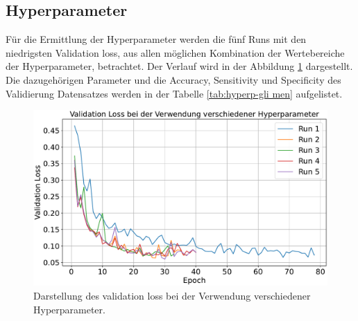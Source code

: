 \subsection{Hyperparameter}
Für die Ermittlung der Hyperparameter werden die fünf Runs mit den niedrigsten Validation loss, aus allen möglichen Kombination der Wertebereiche der Hyperparameter, betrachtet.
Der Verlauf wird in der Abbildung \ref{fig:val_loss gli-men} dargestellt.
Die dazugehörigen Parameter und die Accuracy, Sensitivity und Specificity des Validierung Datensatzes werden in der Tabelle \ref{tab:hyperp-gli men} aufgelistet.
\begin{figure}[H]
  \centering
  \includegraphics[scale=0.3]{plots/Val_loss_Gli_Men.pdf}
  \caption{Darstellung des validation loss bei der Verwendung verschiedener Hyperparameter.}
  \label{fig:val_loss gli-men}
\end{figure}
\begin{table}[H]
    \centering
  \caption{Die fünf Runs mit dem niedrigsten validation loss sowie deren verwendete Hyperparameter und aufgezeichneten Metriken.}
  \label{tab:hyperp-gli men}
\end{table}
